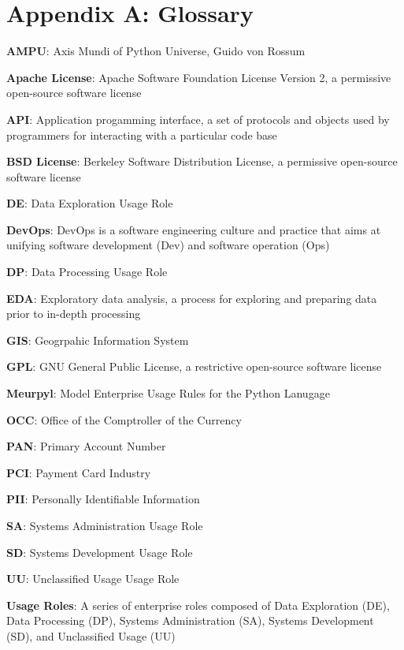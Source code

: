 \newcommand{\definition}[2]{
	\textbf{#1}: #2
}

\section{Appendix A: Glossary}

\thispagestyle{section_start_style}

	\definition{AMPU}{Axis Mundi of Python Universe, Guido von Rossum}

    \definition{Apache License}{Apache Software Foundation License Version 2, a permissive open-source software license}

    \definition{API}{Application progamming interface, a set of protocols and objects used by programmers for interacting with a particular code base}

    \definition{BSD License}{Berkeley Software Distribution License, a permissive open-source software license}

	\definition{DE}{Data Exploration Usage Role}

    \definition{DevOps}{DevOps is a software engineering culture and practice that aims at unifying software development (Dev) and software operation (Ops)}

	\definition{DP}{Data Processing Usage Role}

	\definition{EDA}{Exploratory data analysis, a process for exploring and preparing data prior to in-depth processing}

	\definition{GIS}{Geogrpahic Information System}

    \definition{GPL}{GNU General Public License, a restrictive open-source software license}

	\definition{Meurpyl}{Model Enterprise Usage Rules for the Python Lanugage}

	\definition{OCC}{Office of the Comptroller of the Currency}

	\definition{PAN}{Primary Account Number}

	\definition{PCI}{Payment Card Industry}

	\definition{PII}{Personally Identifiable Information}

	\definition{SA}{Systems Administration Usage Role}

	\definition{SD}{Systems Development Usage Role}

	\definition{UU}{Unclassified Usage Usage Role}

	\definition{Usage Roles}{A series of enterprise roles composed of Data Exploration (DE), Data Processing (DP), Systems Administration (SA), Systems Development (SD), and Unclassified Usage (UU)}

\setlength{\parskip}{1em}
